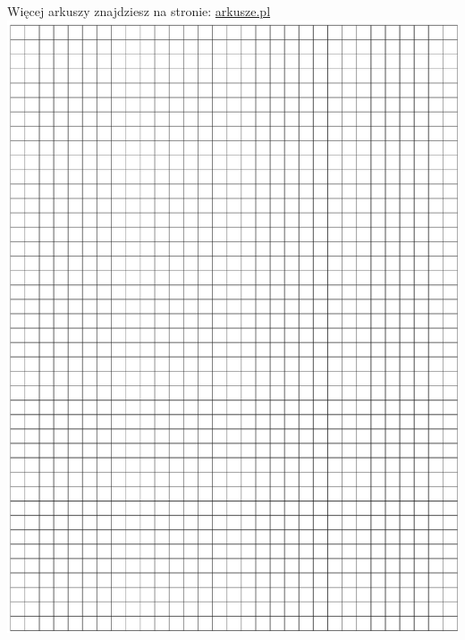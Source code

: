 \documentclass[10pt]{article}
\begin{document}
Więcej arkuszy znajdziesz na stronie: \href{http://arkusze.pl}{arkusze.pl}\\
\includegraphics[max width=\textwidth, center]{2024_11_21_f29375993e8c629c464fg-16}\\
\end{document}
